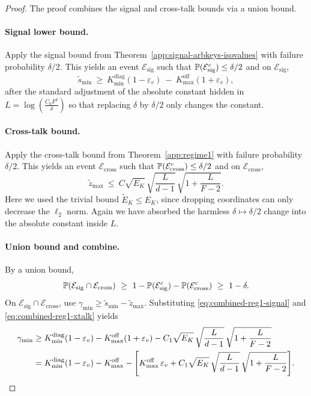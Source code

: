\begin{proof}
The proof combines the signal and cross-talk bounds via a union bound.
\paragraph{Signal lower bound.}
Apply the signal bound from Theorem~\ref{app:signal-arbkeys-isovalues} with failure probability \(\delta/2\).
This yields an event \(\mathcal E_{\mathrm{sig}}\) such that
\(
\mathbb{P}(\mathcal E_{\mathrm{sig}}^c)\le \delta/2
\)
and on \(\mathcal E_{\mathrm{sig}}\),
\begin{equation}
\widetilde{s}_{\min}
\ \ge\
K_{\min}^{\mathrm{diag}}(1-\varepsilon_{v})
\ -\
K_{\max}^{\mathrm{off}}(1+\varepsilon_{v}),
\label{eq:combined-reg1-signal}
\end{equation}
after the standard adjustment of the absolute constant hidden in
\(
L=\log(\tfrac{C_{0} F^2}{\delta})
\)
so that replacing \(\delta\) by \(\delta/2\) only changes the constant.

\paragraph{Cross-talk bound.}
Apply the cross-talk bound from Theorem~\ref{app:regime1} with failure probability \(\delta/2\).
This yields an event \(\mathcal E_{\mathrm{cross}}\) such that
\(
\mathbb{P}(\mathcal E_{\mathrm{cross}}^c)\le \delta/2
\)
and on \(\mathcal E_{\mathrm{cross}}\),
\begin{equation}
\widetilde{z}_{\max}
\ \le\
C\sqrt{E_K}\,\sqrt{\frac{L}{d-1}}\,\sqrt{1+\frac{L}{F-2}}.
\label{eq:combined-reg1-xtalk}
\end{equation}
Here we used the trivial bound \(\widetilde{E}_{K}\le E_{K}\), since dropping coordinates can only decrease the $\ell_{2}$ norm.
Again we have absorbed the harmless \(\delta\mapsto \delta/2\) change into the absolute constant inside \(L\).

\paragraph{Union bound and combine.}
By a union bound,
\[
\mathbb{P}(\mathcal E_{\mathrm{sig}}\cap \mathcal E_{\mathrm{cross}})
\ \ge\
1-\mathbb{P}(\mathcal E_{\mathrm{sig}}^c)-\mathbb{P}(\mathcal E_{\mathrm{cross}}^c)
\ \ge\ 1-\delta.
\]
On \(\mathcal E_{\mathrm{sig}}\cap \mathcal E_{\mathrm{cross}}\), use \(\gamma_{\min}\ge \widetilde{s}_{\min}-\widetilde{z}_{\max}\).
Substituting \eqref{eq:combined-reg1-signal} and \eqref{eq:combined-reg1-xtalk} yields
\begin{align}
\gamma_{\min}
&\ge
K_{\min}^{\mathrm{diag}}(1-\varepsilon_{v})
-
K_{\max}^{\mathrm{off}}(1+\varepsilon_{v})
-
C_{1}\sqrt{E_K}\,\sqrt{\frac{L}{d-1}}\,\sqrt{1+\frac{L}{F-2}}
\notag\\
&=
K_{\min}^{\mathrm{diag}}(1-\varepsilon_{v})
-
K_{\max}^{\mathrm{off}}
-
\Bigg[
K_{\max}^{\mathrm{off}}\,\varepsilon_{v}
+
C_{1}\sqrt{E_K}\,\sqrt{\frac{L}{d-1}}\,\sqrt{1+\frac{L}{F-2}}
\Bigg].
\label{eq:combined-reg1-before-absorb}
\end{align}


\end{proof}

